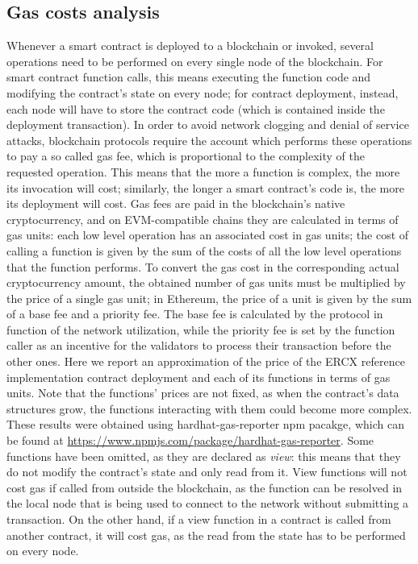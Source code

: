 \documentclass[english, LaM, oneside]{sapthesis}%
\begin{document}
\subsection{Gas costs analysis}
Whenever a smart contract is deployed to a blockchain or invoked, several operations need to be performed on every single node of the blockchain. For smart contract function calls, this means executing the function code and modifying the contract's state on every node; for contract deployment, instead, each node will have to store the contract code (which is contained inside the deployment transaction). In order to avoid network clogging and denial of service attacks, blockchain protocols require the account which performs these operations to pay a so called gas fee, which is proportional to the complexity of the requested operation. This means that the more a function is complex, the more its invocation will cost; similarly, the longer a smart contract's code is, the more its deployment will cost.\newline
Gas fees are paid in the blockchain's native cryptocurrency, and on EVM-compatible chains they are calculated in terms of gas units: each low level operation has an associated cost in gas units; the cost of calling a function is given by the sum of the costs of all the low level operations that the function performs. To convert the gas cost in the corresponding actual cryptocurrency amount, the obtained number of gas units must be multiplied by the price of a single gas unit; in Ethereum, the price of a unit is given by the sum of a base fee and a priority fee. The base fee is calculated by the protocol in function of the network utilization, while the priority fee is set by the function caller as an incentive for the validators to process their transaction before the other ones.\newline
Here we report an approximation of the price of the ERCX reference implementation contract deployment and each of its functions in terms of gas units. Note that the functions' prices are not fixed, as when the contract's data structures grow, the functions interacting with them could become more complex. These results were obtained using hardhat-gas-reporter npm pacakge, which can be found at \url{https://www.npmjs.com/package/hardhat-gas-reporter}. Some functions have been omitted, as they are declared as \textit{view}: this means that they do not modify the contract's state and only read from it. View functions will not cost gas if called from outside the blockchain, as the function can be resolved in the local node that is being used to connect to the network without submitting a transaction. On the other hand, if a view function in a contract is called from another contract, it will cost gas, as the read from the state has to be performed on every node. \newline
\end{document}
